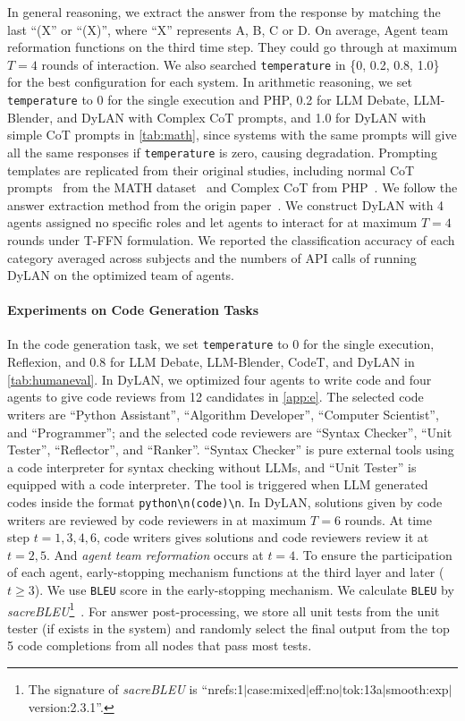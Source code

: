 \documentclass{article} %
\begin{document}
In general reasoning, we extract the answer from the response by matching the last ``(X'' or ``(X)'', where ``X'' represents A, B, C or D. On average, Agent team reformation functions on the third time step. They could go through at maximum $T=4$ rounds of interaction. We also searched \texttt{temperature} in \{0, 0.2, 0.8, 1.0\} for the best configuration for each system. 
In arithmetic reasoning, we set \texttt{temperature} to 0 for the single execution and PHP, 0.2 for LLM Debate, LLM-Blender, and DyLAN with Complex CoT prompts, and 1.0 for DyLAN with simple CoT prompts in \cref{tab:math}, since systems with the same prompts will give all the same responses if \texttt{temperature} is zero, causing degradation. Prompting templates are replicated from their original studies, including normal CoT prompts~\citep{cot} from the MATH dataset~\citep{hendrycksmath2021} and Complex CoT from PHP~\citep{PHPrompting}. We follow the answer extraction method from the origin paper~\citep{hendrycksmath2021}. We construct DyLAN with 4 agents assigned no specific roles and let agents to interact for at maximum $T=4$ rounds under T-FFN formulation. We reported the classification accuracy of each category averaged across subjects and the numbers of API calls of running DyLAN on the optimized team of agents. 

\paragraph{Experiments on Code Generation Tasks}

In the code generation task, we set \texttt{temperature} to 0 for the single execution, Reflexion, and 0.8 for LLM Debate, LLM-Blender, CodeT, and DyLAN in \cref{tab:humaneval}. In DyLAN, we optimized four agents to write code and four agents to give code reviews from 12 candidates in \cref{app:e}. The selected code writers are ``Python Assistant'', ``Algorithm Developer'', ``Computer Scientist'', and ``Programmer''; and the selected code reviewers are ``Syntax Checker'', ``Unit Tester'', ``Reflector'', and ``Ranker''. ``Syntax Checker'' is pure external tools using a code interpreter for syntax checking without LLMs, and ``Unit Tester'' is equipped with a code interpreter. The tool is triggered when LLM generated codes inside the format \textasciigrave\textasciigrave\textasciigrave\verb|python\n(code)\n|\textasciigrave\textasciigrave\textasciigrave. In DyLAN, solutions given by code writers are reviewed by code reviewers in at maximum $T=6$ rounds. At time step $t=1, 3, 4, 6$, code writers gives solutions and code reviewers review it at $t=2,5$. And \textit{agent team reformation} occurs at $t=4$. To ensure the participation of each agent, early-stopping mechanism functions at the third layer and later ($t\geq3$). 
We use \texttt{BLEU} score in the early-stopping mechanism. We calculate \texttt{BLEU} by \textit{sacreBLEU}\footnote{The signature of \textit{sacreBLEU} is ``nrefs:1$\vert$case:mixed$\vert$eff:no$\vert$tok:13a$\vert$smooth:exp$\vert$version:2.3.1''.}~\citep{post-2018-sacrebleu}. For answer post-processing, we store all unit tests from the unit tester (if exists in the system) and randomly select the final output from the top 5 code completions from all nodes that pass most tests.
\end{document}
